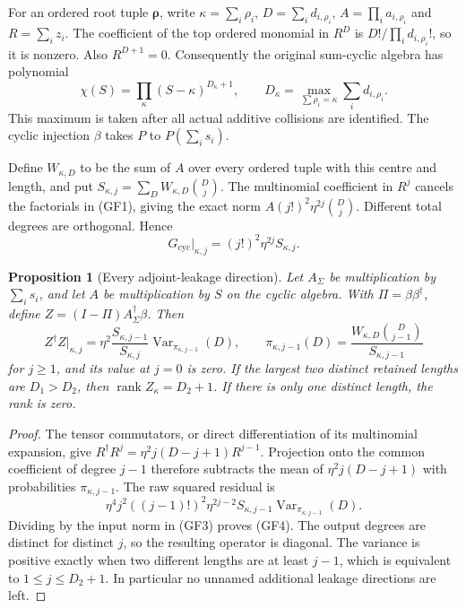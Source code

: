 \documentclass[11pt]{article}
\newcommand{\rank}{\operatorname{rank}}\newcommand{\Rea}{\operatorname{Re}}
\newcommand{\Var}{\operatorname{Var}}
\newtheorem{proposition}[theorem]{Proposition}
\begin{document}
For an ordered root tuple $\boldsymbol\rho$, write
$\kappa=\sum_i\rho_i$, $D=\sum_i d_{i,\rho_i}$,
$A=\prod_i a_{i,\rho_i}$ and $R=\sum_i z_i$.
The coefficient of the top ordered monomial in $R^D$ is
$D!/\prod_i d_{i,\rho_i}!$, so it is nonzero. Also $R^{D+1}=0$.
Consequently the original sum-cyclic algebra has polynomial
\[
\chi(S)=\prod_\kappa(S-\kappa)^{D_\kappa+1},\qquad
D_\kappa=\max_{\sum\rho_i=\kappa}\sum_i d_{i,\rho_i}.
\tag{GF2}
\]
This maximum is taken after all actual additive collisions are identified.
The cyclic injection $\beta$ takes $P$ to $P(\sum_i s_i)$.

Define $W_{\kappa,D}$ to be the sum of $A$ over every ordered tuple
with this centre and length, and put
$S_{\kappa,j}=\sum_DW_{\kappa,D}\binom Dj$.
The multinomial coefficient in $R^j$ cancels the factorials in (GF1),
giving the exact norm $A(j!)^2\eta^{2j}\binom Dj$.
Different total degrees are orthogonal. Hence
\[
G_{\mathrm{cyc}}\big|_{\kappa,j}
=(j!)^2\eta^{2j}S_{\kappa,j}.
\tag{GF3}
\]

\begin{proposition}[Every adjoint-leakage direction]
Let $A_\Sigma$ be multiplication by $\sum_i s_i$, and let $A$ be
multiplication by $S$ on the cyclic algebra. With $\Pi=\beta\beta^\dagger$,
define $Z=(I-\Pi)A_\Sigma^\dagger\beta$. Then
\[
Z^\dagger Z\big|_{\kappa,j}
=\eta^2\frac{S_{\kappa,j-1}}{S_{\kappa,j}}
\Var_{\pi_{\kappa,j-1}}(D),\qquad
\pi_{\kappa,j-1}(D)=\frac{W_{\kappa,D}\binom D{j-1}}{S_{\kappa,j-1}}
\tag{GF4}
\]
for $j\ge1$, and its value at $j=0$ is zero. If the largest two distinct
retained lengths are $D_1>D_2$, then $\rank Z_\kappa=D_2+1$.
If there is only one distinct length, the rank is zero.
\end{proposition}
\begin{proof}
The tensor commutators, or direct differentiation of its multinomial
expansion, give $R^\dagger R^j=\eta^2j(D-j+1)R^{j-1}$.
Projection onto the common coefficient of degree $j-1$ therefore subtracts
the mean of $\eta^2j(D-j+1)$ with probabilities $\pi_{\kappa,j-1}$.
The raw squared residual is
\[
\eta^4j^2((j-1)!)^2\eta^{2j-2}
S_{\kappa,j-1}\Var_{\pi_{\kappa,j-1}}(D).
\]
Dividing by the input norm in (GF3) proves (GF4). The output degrees
are distinct for distinct $j$, so the resulting operator is diagonal.
The variance is positive exactly when two different lengths are at
least $j-1$, which is equivalent to $1\le j\le D_2+1$.
In particular no unnamed additional leakage directions are left.
\end{proof}
\end{document}
